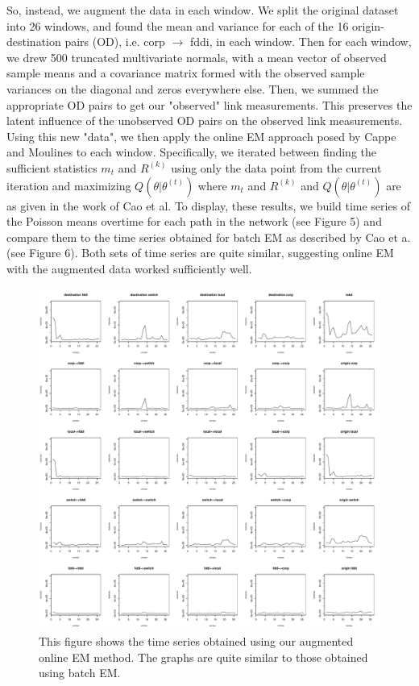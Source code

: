 \documentclass[12pt]{article}
\begin{document}
So, instead, we augment the data in each window. We split the original dataset into 26 windows, and found the mean and variance for each of the 16 origin-destination pairs (OD), i.e. corp $\rightarrow$ fddi, in each window. Then for each window, we drew 500 truncated multivariate normals, with a mean vector of observed sample means and a covariance matrix formed with the observed sample variances on the diagonal and zeros everywhere else. Then, we summed the appropriate OD pairs to get our "observed" link measurements. This preserves the latent influence of the unobserved OD pairs on the observed link measurements. Using this new "data", we then apply the online EM approach posed by Cappe and Moulines to each window. Specifically, we iterated between finding the sufficient statistics $m_{t}$ and $R^{(k)}$ using only the data point from the current iteration and maximizing $Q(\theta | \theta^{(t)})$ where $m_{t}$ and $R^{(k)}$ and  $Q(\theta | \theta^{(t)})$ are as given in the work of Cao et al. To display, these results, we build time series of the Poisson means overtime  for each path in the network (see Figure 5) and compare them to the time series obtained for batch EM as described by Cao et a. (see Figure 6). Both sets of time series are quite similar, suggesting online EM with the augmented data worked sufficiently well. \\

\begin{figure}[b!]
\centering
\includegraphics[width = \textwidth]{novelty_online_em.PDF}
\caption{This figure shows the time series obtained using our augmented online EM method. The graphs are quite similar to those obtained using batch EM.} \label{f2}
\end{figure}
\end{document}
